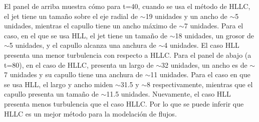 \documentclass[12pt,a4paper]{book}
\begin{document}
El panel de arriba muestra cómo para t=40, cuando se usa el método de HLLC, el jet tiene un tamaño sobre el eje radial de $\sim$19 unidades y un ancho de $\sim$5 unidades, mientras el capullo tiene un 
ancho máximo de $\sim$7 unidades. Para el caso, en el que se usa HLL, el jet tiene un tamaño de $\sim$18 unidades, un grosor de $\sim$5 unidades, y el capullo alcanza una anchura de $\sim$4 unidades. El caso HLL presenta 
una menor turbulencia con respecto a HLLC.
Para el panel de abajo (a t=80), en el caso de HLLC, presenta un largo de $\sim$32 unidades, un ancho es de $\sim$7 unidades y su capullo tiene una anchura de $\sim$11 unidades. Para el caso en que se usa HLL, el largo 
y ancho miden $\sim$31.5 y $\sim$8 respectivamente, mientras que el capullo presenta un tamaño de $\sim$11.5 unidades. Nuevamente, el caso HLL presenta menos turbulencia que el caso HLLC. Por lo que se puede inferir que HLLC
es un mejor método para la modelación de flujos.
\end{document}
